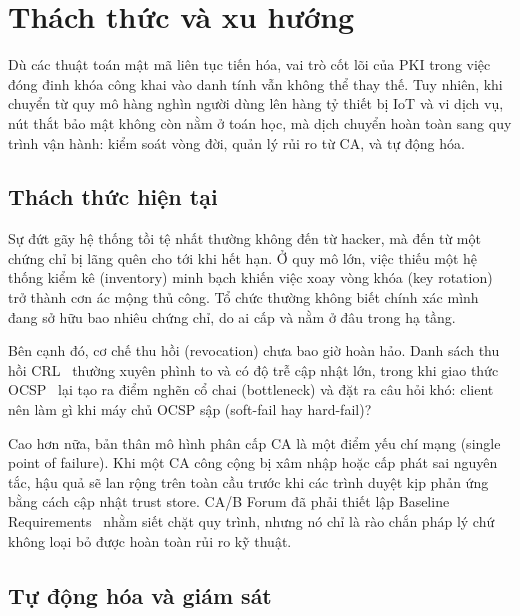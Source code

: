 \chapter{Thách thức và xu hướng}
\label{chap:challenges}

Dù các thuật toán mật mã liên tục tiến hóa, vai trò cốt lõi của PKI trong việc đóng đinh khóa công khai vào danh tính vẫn không thể thay thế. Tuy nhiên, khi chuyển từ quy mô hàng nghìn người dùng lên hàng tỷ thiết bị IoT và vi dịch vụ, nút thắt bảo mật không còn nằm ở toán học, mà dịch chuyển hoàn toàn sang quy trình vận hành: kiểm soát vòng đời, quản lý rủi ro từ CA, và tự động hóa.

\section{Thách thức hiện tại}
\label{sec:7.1}

Sự đứt gãy hệ thống tồi tệ nhất thường không đến từ hacker, mà đến từ một chứng chỉ bị lãng quên cho tới khi hết hạn. Ở quy mô lớn, việc thiếu một hệ thống kiểm kê (inventory) minh bạch khiến việc xoay vòng khóa (key rotation) trở thành cơn ác mộng thủ công. Tổ chức thường không biết chính xác mình đang sở hữu bao nhiêu chứng chỉ, do ai cấp và nằm ở đâu trong hạ tầng.

Bên cạnh đó, cơ chế thu hồi (revocation) chưa bao giờ hoàn hảo. Danh sách thu hồi CRL~\cite{RFC5280} thường xuyên phình to và có độ trễ cập nhật lớn, trong khi giao thức OCSP~\cite{RFC6960} lại tạo ra điểm nghẽn cổ chai (bottleneck) và đặt ra câu hỏi khó: client nên làm gì khi máy chủ OCSP sập (soft-fail hay hard-fail)? 

Cao hơn nữa, bản thân mô hình phân cấp CA là một điểm yếu chí mạng (single point of failure). Khi một CA công cộng bị xâm nhập hoặc cấp phát sai nguyên tắc, hậu quả sẽ lan rộng trên toàn cầu trước khi các trình duyệt kịp phản ứng bằng cách cập nhật trust store. CA/B Forum đã phải thiết lập Baseline Requirements~\cite{CABForum} nhằm siết chặt quy trình, nhưng nó chỉ là rào chắn pháp lý chứ không loại bỏ được hoàn toàn rủi ro kỹ thuật.

\section{Tự động hóa và giám sát}
\label{sec:7.2}


